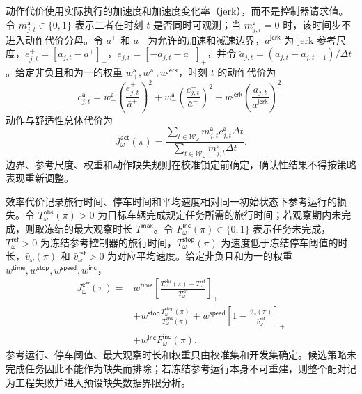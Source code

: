 \documentclass[10pt,a4paper,twocolumn]{article}
\begin{document}
动作代价使用实际执行的加速度和加速度变化率（jerk），而不是控制器请求值。令 $m_{j,t}^{\mathsf a}\in\{0,1\}$ 表示二者在时刻 $t$ 是否同时可观测；当 $m_{j,t}^{\mathsf a}=0$ 时，该时间步不进入动作代价分母。令 $\bar a^{+}$ 和 $\bar a^{-}$ 为允许的加速和减速边界，$\bar a^{\mathsf{jerk}}$ 为 jerk 参考尺度，$e_{j,t}^{+}=[a_{j,t}-\bar a^{+}]_+$，$e_{j,t}^{-}=[-a_{j,t}-\bar a^{-}]_+$，并令 $\dot a_{j,t}=(a_{j,t}-a_{j,t-1})/\Delta t$。给定非负且和为一的权重 $w_{+}^{\mathsf a},w_{-}^{\mathsf a},w^{\mathsf{jerk}}$，时刻 $t$ 的动作代价为
\begin{equation*}
c_{j,t}^{\mathsf a}=
w_{+}^{\mathsf a}\left(\frac{e_{j,t}^{+}}{\bar a^{+}}\right)^2+
w_{-}^{\mathsf a}\left(\frac{e_{j,t}^{-}}{\bar a^{-}}\right)^2+
w^{\mathsf{jerk}}\left(\frac{\dot a_{j,t}}{\bar a^{\mathsf{jerk}}}\right)^2.
\end{equation*}
动作与舒适性总体代价为
\begin{equation*}
J_{\omega}^{\mathsf{act}}(\pi)
=\frac{\sum_{t\in\mathcal W_\omega}m_{j,t}^{\mathsf a}
c_{j,t}^{\mathsf a}\Delta t}
{\sum_{t\in\mathcal W_\omega}m_{j,t}^{\mathsf a}\Delta t}.
\end{equation*}
边界、参考尺度、权重和动作缺失规则在校准锁定前确定，确认性结果不得按策略表现重新调整。

效率代价记录旅行时间、停车时间和平均速度相对同一初始状态下参考运行的损失。令 $T_{\omega}^{\mathsf{obs}}(\pi)>0$ 为目标车辆完成规定任务所需的旅行时间；若观察期内未完成，则取冻结的最大观察时长 $T^{\mathsf{max}}$。令 $F_{\omega}^{\mathsf{inc}}(\pi)\in\{0,1\}$ 表示任务未完成，$T_{\omega}^{\mathsf{ref}}>0$ 为冻结参考控制器的旅行时间，$T_{\omega}^{\mathsf{stop}}(\pi)$ 为速度低于冻结停车阈值的时长，$\bar v_{\omega}(\pi)$ 和 $\bar v_{\omega}^{\mathsf{ref}}>0$ 为对应平均速度。给定非负且和为一的权重 $w^{\mathsf{time}},w^{\mathsf{stop}},w^{\mathsf{speed}},w^{\mathsf{inc}}$，
\begin{equation*}
\begin{aligned}
J_{\omega}^{\mathsf{eff}}(\pi)
={}&w^{\mathsf{time}}\left[
\frac{T_{\omega}^{\mathsf{obs}}(\pi)-T_{\omega}^{\mathsf{ref}}}
{T_{\omega}^{\mathsf{ref}}}\right]_+\\
&+w^{\mathsf{stop}}\frac{T_{\omega}^{\mathsf{stop}}(\pi)}
{T_{\omega}^{\mathsf{obs}}(\pi)}
+w^{\mathsf{speed}}\left[
1-\frac{\bar v_{\omega}(\pi)}{\bar v_{\omega}^{\mathsf{ref}}}\right]_+\\
&+w^{\mathsf{inc}}F_{\omega}^{\mathsf{inc}}(\pi).
\end{aligned}
\end{equation*}
参考运行、停车阈值、最大观察时长和权重只由校准集和开发集确定。候选策略未完成任务因此不能作为缺失而排除；若冻结参考运行本身不可重建，则整个配对记为工程失败并进入预设缺失数据界限分析。
\end{document}
